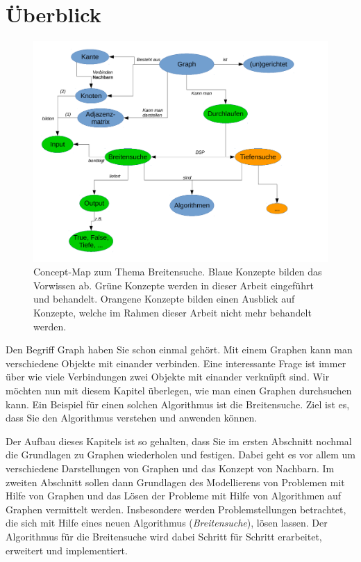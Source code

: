 \section*{Überblick}

\begin{figure}[htb]
\begin{center}
\includegraphics[width=.99\textwidth]{../cmap/bsuche_cmap.pdf}
\caption{Concept-Map zum Thema Breitensuche.
Blaue Konzepte bilden das Vorwissen ab. 
Grüne Konzepte werden in dieser Arbeit eingeführt und behandelt. 
Orangene Konzepte bilden einen Ausblick auf Konzepte, welche im Rahmen dieser Arbeit nicht mehr behandelt werden. 
}
\label{fig:cmap2}
\end{center}
\end{figure}


Den Begriff Graph haben Sie schon einmal gehört. Mit einem Graphen kann man verschiedene Objekte mit einander verbinden. 
Eine interessante Frage ist immer über wie viele Verbindungen zwei Objekte mit einander verknüpft sind. 
Wir möchten nun mit diesem Kapitel überlegen, wie man einen Graphen durchsuchen kann.
Ein Beispiel für einen solchen Algorithmus ist die Breitensuche. 
Ziel ist es, dass Sie den Algorithmus verstehen und anwenden können. 

Der Aufbau dieses Kapitels ist so gehalten, dass Sie im ersten Abschnitt nochmal die Grundlagen zu Graphen wiederholen und festigen. 
Dabei geht es vor allem um verschiedene Darstellungen von Graphen und das Konzept von Nachbarn.
Im zweiten Abschnitt sollen dann Grundlagen des Modellierens von Problemen mit Hilfe von Graphen und das L\"osen der Probleme mit Hilfe von Algorithmen auf Graphen vermittelt werden.
Insbesondere werden Problemstellungen betrachtet, die sich mit Hilfe eines neuen Algorithmus (\emph{Breitensuche}), lösen lassen. 
Der Algorithmus für die Breitensuche wird dabei Schritt f\"ur Schritt erarbeitet, erweitert und implementiert.

